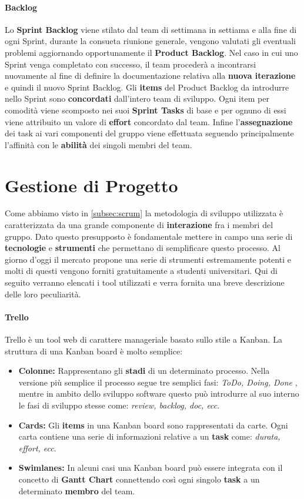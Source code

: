 	\paragraph{Backlog} %
	\label{par:backlog}
	Lo \textbf{Sprint Backlog} viene stilato dal team di settimana in settiama e alla fine di ogni Sprint, durante la consueta riunione generale, vengono valutati gli eventuali problemi aggiornando opportunamente il \textbf{Product Backlog}. Nel caso in cui uno Sprint venga completato con successo, il team procederà a incontrarsi nuovamente al fine di definire la documentazione relativa alla \textbf{nuova iterazione} e quindi il nuovo Sprint Backlog. Gli \textbf{items} del Product Backlog da introdurre nello Sprint sono \textbf{concordati} dall'intero team di sviluppo. Ogni item per comodità viene scomposto nei suoi \textbf{Sprint Tasks} di base e per ognuno di essi viene attribuito un valore di \textbf{effort} concordato dal team. Infine l'\textbf{assegnazione} dei task ai vari componenti del gruppo viene effettuata seguendo principalmente l'affinità con le \textbf{abilità} dei singoli membri del team.  

\section{Gestione di Progetto}
Come abbiamo visto in \ref{subsec:scrum} la metodologia di sviluppo utilizzata è caratterizzata da una grande componente di \textbf{interazione} fra i membri del gruppo. Dato questo presupposto è fondamentale mettere in campo una serie di \textbf{tecnologie} e \textbf{strumenti} che permettano di semplificare questo processo. Al giorno d'oggi il mercato propone una serie di strumenti estremamente potenti e molti di questi vengono forniti gratuitamente a studenti universitari. Qui di seguito verranno elencati i tool utilizzati e verra fornita una breve descrizione delle loro peculiarità.

\paragraph{Trello} %
 Trello è un tool web di carattere manageriale basato sullo stile a Kanban. La struttura di una Kanban board è molto semplice: 
 \begin{itemize}
 	\item{\textbf{Colonne:}}
 	Rappresentano gli \textbf{stadi} di un determinato processo. Nella versione più semplice il processo segue tre semplici fasi: \textit{ToDo, Doing, Done }, mentre in ambito dello sviluppo software questo può introdurre al suo interno le fasi di sviluppo stesse come: \textit{review, backlog, doc, ecc}.
 	\item{\textbf{Cards:}}
 	Gli \textbf{items} in una Kanban board sono rappresentati da carte. Ogni carta contiene una serie di informazioni relative a un \textbf{task} come: \textit{durata, effort, ecc}.
 	\item{\textbf{Swimlanes:}}
 	In alcuni casi una Kanban board può essere integrata con il concetto di \textbf{Gantt Chart} connettendo così ogni singolo \textbf{task} a un determinato \textbf{membro} del team.
 \end{itemize}

